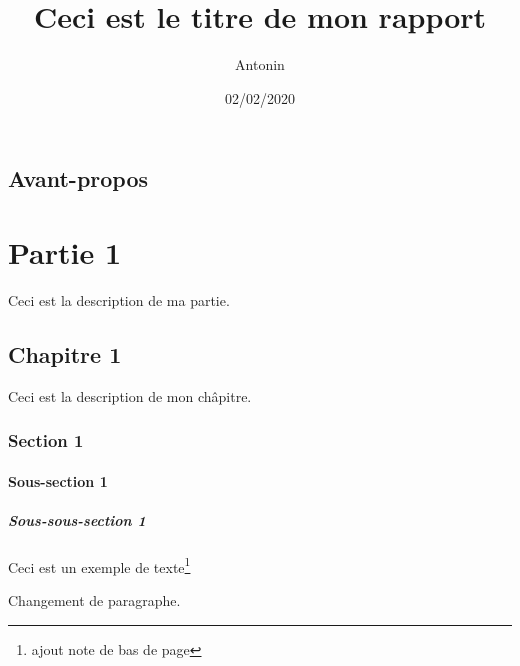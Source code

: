 \documentclass[a4paper,french,11pt]{report}
\title{Ceci est le titre de mon rapport}
\author{Antonin}
\date{02/02/2020}
\begin{document}
\maketitle %

\tableofcontents %

\chapter*{Avant-propos}

\part{Partie 1}
Ceci est la description de ma partie.

\chapter{Chapitre 1}
Ceci est la description de mon châpitre.

\section{Section 1}
\subsection{Sous-section 1}
\subsubsection{Sous-sous-section 1}

Ceci est un exemple de texte\thanks{ajout note de bas de page}

Changement de paragraphe.
\end{document}
